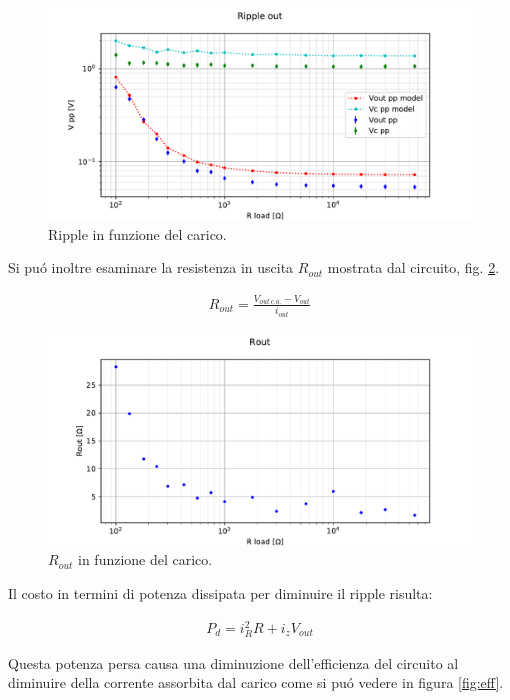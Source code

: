 \begin{figure}[h]
\centering
\includegraphics[width=\textwidth]{fig5.pdf}
\caption{Ripple in funzione del carico.}
\label{fig:vdiodpp}
\end{figure}

Si pu\'o inoltre esaminare la resistenza in uscita $R_{out}$ mostrata dal circuito, fig. \ref{fig:rout}.

\begin{gather}
	R_{out} = \frac{V_{out\, c.a.} - V_{out}}{i_{out}}
\end{gather}

\begin{figure}[h]
\centering
\includegraphics[width=\textwidth]{fig6.pdf}
\caption{$R_{out}$ in funzione del carico.}
\label{fig:rout}
\end{figure}

\FloatBarrier

Il costo in termini di potenza dissipata per diminuire il ripple risulta:

\begin{gather}
	P_d = i_R^2 R + i_z V_{out}
\end{gather}

Questa potenza persa causa una diminuzione dell'efficienza del circuito al diminuire della corrente assorbita dal carico come si pu\'o vedere in figura \ref{fig:eff}.

